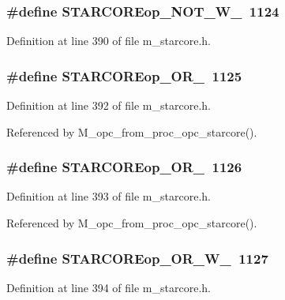 \subsubsection{\setlength{\rightskip}{0pt plus 5cm}\#define STARCOREop\_\-NOT\_\-W\_~1124}\label{m__starcore_8h_e83a3c1f5db913892049e2207db4a4e4}




Definition at line 390 of file m\_\-starcore.h.
\subsubsection{\setlength{\rightskip}{0pt plus 5cm}\#define STARCOREop\_\-OR\_~1125}\label{m__starcore_8h_0f393f80264d8b51871a0ed103eac7bb}




Definition at line 392 of file m\_\-starcore.h.

Referenced by M\_\-opc\_\-from\_\-proc\_\-opc\_\-starcore().
\subsubsection{\setlength{\rightskip}{0pt plus 5cm}\#define STARCOREop\_\-OR\_~1126}\label{m__starcore_8h_e618575e135b112a09f180dac1bc040d}




Definition at line 393 of file m\_\-starcore.h.

Referenced by M\_\-opc\_\-from\_\-proc\_\-opc\_\-starcore().
\subsubsection{\setlength{\rightskip}{0pt plus 5cm}\#define STARCOREop\_\-OR\_\-W\_~1127}\label{m__starcore_8h_76e8c82172d19e374bdf9e8bd2c0c501}




Definition at line 394 of file m\_\-starcore.h.
